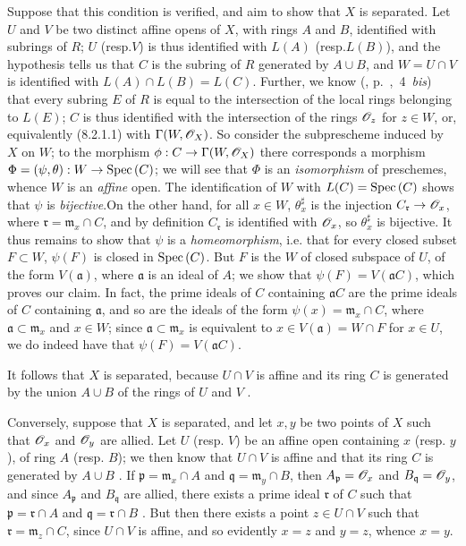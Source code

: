 Suppose that this condition is verified, and aim to show that $X$ is separated.
Let $U$ and $V$ be two distinct affine opens of $X$, with rings $A$ and $B$,
identified with subrings of $R$; $U$ (resp.$V$) is thus identified 
with $L(A)$ (resp.$L(B)$), and the hypothesis tells us  that $C$ is
the subring of $R$ generated by $A\cup B$, and $W=U\cap V$ is identified with
$L(A)\cap L(B)=L(C)$. Further, we know
(\cite{1}, p.~,~4~\emph{bis}) that every subring $E$ of $R$ is
equal to the intersection of the local rings belonging to $L(E)$; $C$ is thus
identified with the intersection of the rings $\mathscr{O}_z$ for $z\in W$, or,
equivalently (8.2.1.1) with $\Gamma(W,\mathscr{O}_X)$. So consider the subprescheme
induced by $X$ on $W$; to the  morphism $\phi:
C\to\Gamma(W,\mathscr{O}_X)$ there corresponds  a morphism
$\Phi=(\psi,\theta):W\to{\mathop{\mathrm{Spec}}\nolimits}\,(C)$; we will see that $\Phi$ is an
\emph{isomorphism} of preschemes, whence $W$ is an \emph{affine} open. The
identification of $W$ with $L(C)={\mathop{\mathrm{Spec}}\nolimits}\,(C)$ shows that $\psi$ is
\emph{bijective}.On the other hand, for all $x\in W$, $\theta_x^\sharp$ is the
injection $C_\mathfrak{r}\to\mathscr{O}_x$, where $\mathfrak{r}=\mathfrak{m}_x\cap C$,
and by definition $C_\mathfrak{r}$ is identified with $\mathscr{O}_x$, so $\theta_x^\sharp$
is bijective. It thus remains to show that $\psi$ is a \emph{homeomorphism},
i.e. that for every closed subset $F\subset W$, $\psi(F)$ is closed in
${\mathop{\mathrm{Spec}}\nolimits}\,(C)$. But $F$ is the  $W$ of closed subspace of $U$,
of the form $V(\mathfrak{a})$, where $\mathfrak{a}$ is an ideal of $A$; we show
that $\psi(F)=V(\mathfrak{a}C)$, which proves our claim. In fact, the prime
ideals of $C$ containing $\mathfrak{a}C$ are the prime ideals of $C$ containing
$\mathfrak{a}$, and so are the ideals of the form $\psi(x)=\mathfrak{m}_x\cap
C$, where $\mathfrak{a}\subset\mathfrak{m}_x$ and $x\in W$; since
$\mathfrak{a}\subset\mathfrak{m}_x$ is equivalent to $x\in V(\mathfrak{a})=W\cap
F$ for $x\in U$, we do indeed have that $\psi(F)=V(\mathfrak{a}C)$.

It follows that $X$ is separated, because $U\cap V$ is affine and its ring $C$
is generated by the union $A\cup B$ of the rings of $U$ and $V$ .

Conversely, suppose that $X$ is separated, and let $x,y$ be two points of $X$
such that $\mathscr{O}_x$ and $\mathscr{O}_y$ are allied. Let $U$ (resp. $V$) be an affine open
containing $x$ (resp. $y$), of ring $A$ (resp. $B$); we then know that $U\cap V$
is affine and that its ring $C$ is generated by $A\cup B$ . If
$\mathfrak{p}=\mathfrak{m}_x\cap A$ and $\mathfrak{q}=\mathfrak{m}_y\cap B$,
then $A_\mathfrak{p}=\mathscr{O}_x$ and $B_\mathfrak{q}=\mathscr{O}_y$, and since $A_\mathfrak{p}$
and $B_\mathfrak{q}$ are allied, there exists a prime ideal $\mathfrak{r}$ of
$C$ such that $\mathfrak{p}=\mathfrak{r}\cap A$ and
$\mathfrak{q}=\mathfrak{r}\cap B$ . But then there exists a point
$z\in U\cap V$ such that $\mathfrak{r}=\mathfrak{m}_z\cap C$, since $U\cap V$ is
affine, and so evidently $x=z$ and $y=z$, whence $x=y$.

